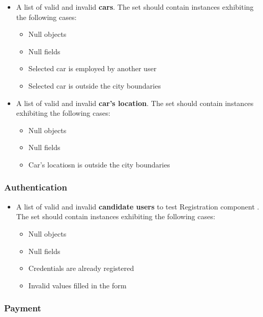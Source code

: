 		\begin{itemize}
		
				\item A list of valid and invalid \textbf{cars}. The set should contain instances exhibiting the following cases:		
				\begin{itemize}
					\item Null objects
					\item Null fields
					\item Selected car is employed by another user
					\item Selected car is outside the city boundaries
				\end{itemize}
				
				\item A list of valid and invalid \textbf{car's location}. The set should contain instances exhibiting the following cases:		
				\begin{itemize}
					\item Null objects
					\item Null fields
					\item Car's locatiosn is outside the city boundaries
				\end{itemize}
		
		\end{itemize}
		
		\subsubsection{Authentication}
		
		\begin{itemize}
				
				\item A list of valid and invalid \textbf{candidate users} to test Registration component . The set should contain instances exhibiting the following cases:		
				\begin{itemize}
					\item Null objects
					\item Null fields
					\item Credentials are already registered
					\item Invalid values filled in the form
				\end{itemize}
		
		\end{itemize}
		
		\subsubsection{Payment}
		
